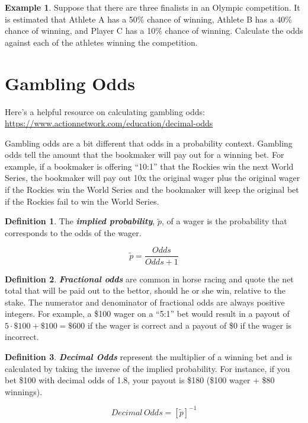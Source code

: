 \documentclass[
  11pt,
]{book}
\theoremstyle{definition}
\newtheorem{definition}{Definition}[chapter]
\theoremstyle{definition}
\newtheorem{example}{Example}[chapter]
\theoremstyle{definition}
\theoremstyle{definition}
\theoremstyle{remark}
\begin{document}
\vfill

\begin{example}
Suppose that there are three finalists in an Olympic competition. It is estimated that Athlete A has a 50\% chance of winning, Athlete B has a 40\% chance of winning, and Player C has a 10\% chance of winning. Calculate the odds against each of the athletes winning the competition.
\end{example}

\vfill

\newpage

\hypertarget{gambling-odds}{%
\section{Gambling Odds}\label{gambling-odds}}

Here's a helpful resource on calculating gambling odds:\\
\url{https://www.actionnetwork.com/education/decimal-odds}

Gambling odds are a bit different that odds in a probability context. Gambling odds tell the amount that the bookmaker will pay out for a winning bet. For example, if a bookmaker is offering ``10:1'' that the Rockies win the next World Series, the bookmaker will pay out 10x the original wager plus the original wager if the Rockies win the World Series and the bookmaker will keep the original bet if the Rockies fail to win the World Series.

\begin{definition}
The \textbf{\emph{implied probability}}, \(\tilde{p}\), of a wager is the probability that corresponds to the odds of the wager.

\[\tilde{p} = \frac{Odds}{Odds+1}\]
\end{definition}

\begin{definition}
\textbf{\emph{Fractional odds}} are common in horse racing and quote the net total that will be paid out to the bettor, should he or she win, relative to the stake. The numerator and denominator of fractional odds are always positive integers. For example, a \$100 wager on a ``5:1'' bet would result in a payout of \(5 \cdot \$100 + \$100 = \$600\) if the wager is correct and a payout of \$0 if the wager is incorrect.
\end{definition}

\begin{definition}
\textbf{\emph{Decimal Odds}} represent the multiplier of a winning bet and is calculated by taking the inverse of the implied probability. For instance, if you bet \$100 with decimal odds of 1.8, your payout is \$180 (\$100 wager + \$80 winnings).

\[Decimal \, Odds = [\tilde{p}]^{-1}\]
\end{definition}
\end{document}
